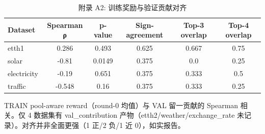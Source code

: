 \begin{table}[htbp]
  \centering
  \caption{附录 A2: 训练奖励与验证贡献对齐}
  \label{tab:appendix_align}
  \begin{tabular}{lccccc}
    \toprule
    Dataset & Spearman ρ & p-value & Sign-agreement & Top-3 overlap & Top-4 overlap \\
    \midrule
    etth1 & 0.286 & 0.493 & 0.625 & 0.667 & 0.75 \\
    solar & -0.81 & 0.0149 & 0.375 & 0.0 & 0.25 \\
    electricity & -0.19 & 0.651 & 0.375 & 0.333 & 0.5 \\
    traffic & -0.548 & 0.16 & 0.375 & 0.333 & 0.25 \\
    \bottomrule
  \end{tabular}
  {\footnotesize TRAIN pool-aware reward（round-0 均值）与 VAL 留一贡献的 Spearman 相关。仅 4 数据集有 val\_contribution 产物（etth2/weather/exchange\_rate 未记录）。对齐并非全面更强（1 正/2 负/1 近 0），如实报告。}
\end{table}
